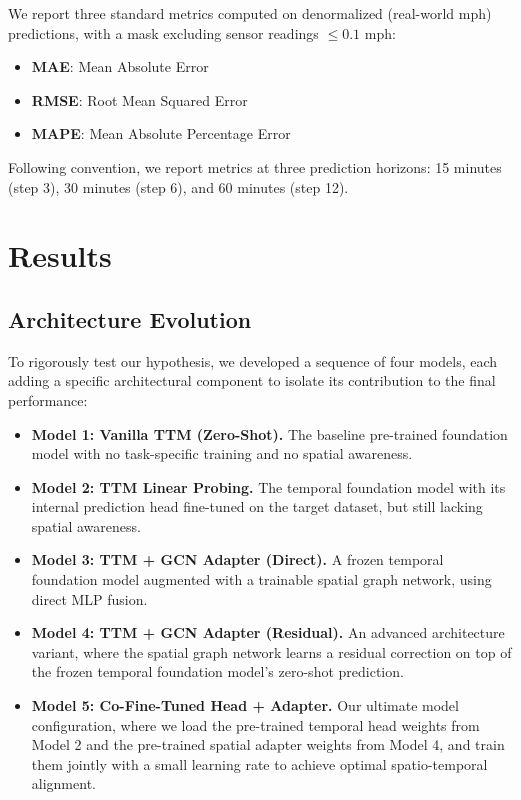 \documentclass[11pt, a4paper]{article}
\begin{document}
We report three standard metrics computed on denormalized (real-world mph) predictions, with a mask excluding sensor readings $\leq 0.1$ mph:
\begin{itemize}[nosep]
    \item \textbf{MAE}: Mean Absolute Error
    \item \textbf{RMSE}: Root Mean Squared Error
    \item \textbf{MAPE}: Mean Absolute Percentage Error
\end{itemize}

Following convention, we report metrics at three prediction horizons: 15 minutes (step 3), 30 minutes (step 6), and 60 minutes (step 12).

\section{Results}
\label{sec:results}

\subsection{Architecture Evolution}

To rigorously test our hypothesis, we developed a sequence of four models, each adding a specific architectural component to isolate its contribution to the final performance:
\begin{itemize}[nosep]
    \item \textbf{Model 1: Vanilla TTM (Zero-Shot).} The baseline pre-trained foundation model with no task-specific training and no spatial awareness.
    \item \textbf{Model 2: TTM Linear Probing.} The temporal foundation model with its internal prediction head fine-tuned on the target dataset, but still lacking spatial awareness.
    \item \textbf{Model 3: TTM + GCN Adapter (Direct).} A frozen temporal foundation model augmented with a trainable spatial graph network, using direct MLP fusion.
    \item \textbf{Model 4: TTM + GCN Adapter (Residual).} An advanced architecture variant, where the spatial graph network learns a residual correction on top of the frozen temporal foundation model's zero-shot prediction.
    \item \textbf{Model 5: Co-Fine-Tuned Head + Adapter.} Our ultimate model configuration, where we load the pre-trained temporal head weights from Model 2 and the pre-trained spatial adapter weights from Model 4, and train them jointly with a small learning rate to achieve optimal spatio-temporal alignment.
\end{itemize}
\end{document}
